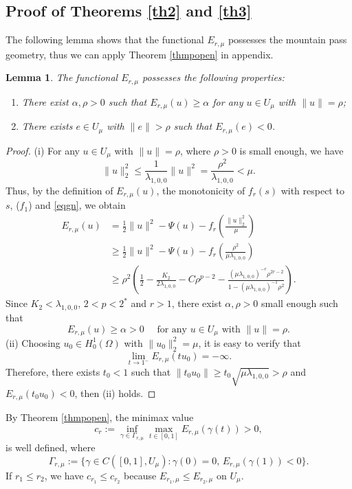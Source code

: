 \documentclass[11pt]{amsart}
\newtheorem{lemma}[theorem]{Lemma}
\newcommand{\norm}[1]{\lVert#1\rVert}
\numberwithin{equation}{section}
\begin{document}
\subsection{Proof of Theorems \ref{th2} and \ref{th3}}\label{secp23}
The following lemma shows that the functional $E_{r, \mu}$ possesses the mountain pass geometry, thus we can apply Theorem \ref{thmpopen} in appendix.
\begin{lemma}\label{lemmpg}
The functional $E_{r, \mu}$ possesses the following properties:
  \begin{enumerate}[label=\rm(\roman*)]
\item There exist $\alpha, \rho>0$ such that $E_{r, \mu}(u) \geq \alpha$ for any $u \in  U_{\mu}$ with $\|u\|=\rho$;
\item There exists  $e \in U_{\mu}$ with $\|e\|>\rho$ such that $E_{r, \mu}(e)<0$.
\end{enumerate}
\end{lemma}
\begin{proof}
    (i) For any $u \in U_{\mu}$ with $\|u\|=\rho$, where $\rho>0$ is small enough, we have
$$
\norm{u}_{2}^2 \leq \frac{1}{\lambda_{1,0,0}}\|u\|^{2}=\frac{\rho^{2}}{\lambda_{1,0,0}} <\mu.
$$
Thus, by the definition of $E_{r, \mu}(u)$, the monotonicity of $f_{r}(s)$ with respect to $s$, ($f_1$) and \eqref{eqgn}, we obtain
$$
\begin{aligned}
E_{r, \mu}(u) & =\frac{1}{2}\|u\|^{2}-\Psi(u)-f_{r}\left(\frac{\norm{u}^2_2}{\mu}\right) \\
& \geq \frac{1}{2}\|u\|^{2}-\Psi(u)-f_{r}\left(\frac{\rho^{2}}{\mu\lambda_{1,0,0}}\right) \\
& \geq \rho^{2}\left(\frac{1}{2}-\frac{K_2}{2\lambda_{1,0,0}}-C \rho^{p-2}-\frac{(\mu\lambda_{1,0,0})^{-r} \rho^{2 r-2}}{1-(\mu\lambda_{1,0,0})^{-1}\rho^{2}}\right).
\end{aligned}
$$
Since $K_2 <\lambda_{1,0,0}$, $2<p<2^*$ and $r>1$, there exist $\alpha, \rho>0$ small enough such that
$$
E_{r, \mu}(u) \geq \alpha>0 \quad \text{ for any}\,\,  u \in U_{\mu} \text { with }\|u\|=\rho.
$$
(ii) Choosing $u_{0} \in H^1_0(\Omega)$ with $\norm{u_0}^2_2=\mu$, it is easy to verify that
$$
\lim _{t \rightarrow 1^{-}} E_{r, \mu}(tu_0)=-\infty.
$$
Therefore, there exists $t_{0}<1$ such that $\norm{t_{0} u_{0}}\geq t_0\sqrt{\mu\lambda_{1,0,0}}>\rho$ and $ E_{r, \mu}(t_0u_0)<0$, then (ii) holds.
\end{proof}
By Theorem \ref{thmpopen},  the minimax value
$$
c_{r}:=\inf _{\gamma \in \Gamma_{r, \mu}} \max _{t \in[0,1]} E_{r, \mu}(\gamma(t))>0,
$$
is well defined, where
$$
\Gamma_{r,\mu} := \{\gamma \in C([0,1], U_{\mu}): \gamma(0)=0,\,  E_{r, \mu}(\gamma(1))<0\}.
$$
 If $r_{1} \leq r_{2}$, we have $c_{r_{1}} \leq c_{r_{2}}$ because $E_{r_1, \mu} \leq E_{r_2, \mu}$ on $U_{\mu}$.
\end{document}
